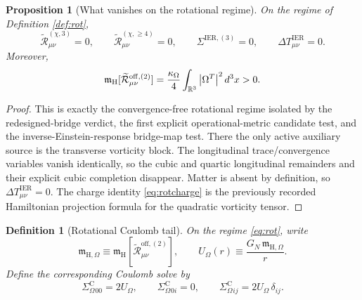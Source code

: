\documentclass[11pt]{article}
\newcommand{\SigmaLongThree}{\Sigma^{\mathrm{IER},(3)}}
\newcommand{\SigmaC}{\Sigma^{\mathrm{C}}}
\newcommand{\ReOffTwo}{\widetilde{\mathcal R}_{\mu\nu}^{\mathrm{off},(2)}}
\newcommand{\ReLongThree}{\widetilde{\mathcal R}_{\mu\nu}^{(\chi,3)}}
\newcommand{\ReLongFour}{\widetilde{\mathcal R}_{\mu\nu}^{(\chi,\ge 4)}}
\newcommand{\DeltaTIER}{\Delta T_{\mu\nu}^{\mathrm{IER}}}
\newcommand{\HamCharge}{\mathfrak m_{\mathrm H}}
\newcommand{\HamChargeOmega}{\mathfrak m_{\mathrm H,\Omega}}
\newtheorem{definition}{Definition}
\newtheorem{proposition}{Proposition}
\begin{document}
\begin{proposition}[What vanishes on the rotational regime]
\label{prop:rotzero}
On the regime of Definition \ref{def:rot},
\begin{equation}
\ReLongThree=0,
\qquad
\ReLongFour=0,
\qquad
\SigmaLongThree=0,
\qquad
\DeltaTIER=0.
\label{eq:rotzero}
\end{equation}
Moreover,
\begin{equation}
\HamCharge[\ReOffTwo]
=
\frac{\kappa_\Omega}{4}\int_{\mathbb R^3}\abs{\Omega^T}^2\,d^3x
>0.
\label{eq:rotcharge}
\end{equation}
\end{proposition}

\begin{proof}
This is exactly the convergence-free rotational regime isolated by the redesigned-bridge verdict, the first explicit operational-metric candidate test, and the inverse-Einstein-response bridge-map test. There the only active auxiliary source is the transverse vorticity block. The longitudinal trace/convergence variables vanish identically, so the cubic and quartic longitudinal remainders and their explicit cubic completion disappear. Matter is absent by definition, so \(\DeltaTIER=0\). The charge identity \eqref{eq:rotcharge} is the previously recorded Hamiltonian projection formula for the quadratic vorticity tensor.
\end{proof}

\begin{definition}[Rotational Coulomb tail]
\label{def:Uomega}
On the regime \eqref{eq:rot}, write
\begin{equation}
\HamChargeOmega
\equiv
\HamCharge[\ReOffTwo],
\qquad
U_\Omega(r)
\equiv
\frac{G_N\,\HamChargeOmega}{r}.
\label{eq:Uomega}
\end{equation}
Define the corresponding Coulomb solve by
\begin{equation}
\SigmaC_\Omega{}_{00}=2U_\Omega,
\qquad
\SigmaC_\Omega{}_{0i}=0,
\qquad
\SigmaC_\Omega{}_{ij}=2U_\Omega\,\delta_{ij}.
\label{eq:SigmaComega}
\end{equation}
\end{definition}
\end{document}
